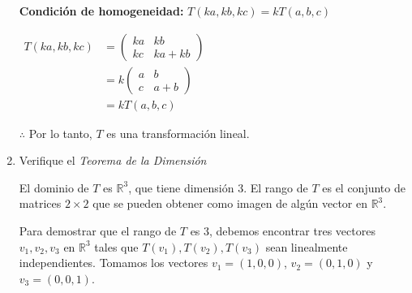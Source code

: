 \begin{enumerate}
    \textbf{Condición de homogeneidad:} $T(ka,kb,kc)=kT(a,b,c)$
    
    $
    \begin{aligned}
        T(ka,kb,kc) &= \left(
                                            \begin{array}{cc}
                                                ka & kb \\
                                                kc & ka+kb
                                            \end{array}
                                        \right) \\
        &= k \left(
                                            \begin{array}{cc}
                                                a & b \\
                                                c & a+b
                                            \end{array}
                                        \right) \\
        &= kT(a,b,c)
    \end{aligned}
    $
       
    $\therefore$ Por lo tanto, $T$ es una transformación lineal.

    \item Verifique el \textit{Teorema de la Dimensión}

    El dominio de $T$ es $\mathbb{R}^{3}$, que tiene dimensión 3.
    El rango de $T$ es el conjunto de matrices $2\times2$ que se pueden obtener como imagen de algún vector en $\mathbb{R}^{3}$.

    Para demostrar que el rango de $T$ es 3, debemos encontrar tres vectores $v_{1}, v_{2}, v_{3}$ en $\mathbb{R}^{3}$ tales que $T(v_{1}), T(v_{2}), T(v_{3})$ sean linealmente independientes. Tomamos los vectores $v_{1} = (1,0,0)$, $v_{2} = (0,1,0)$ y $v_{3} = (0,0,1)$.


\end{enumerate}
